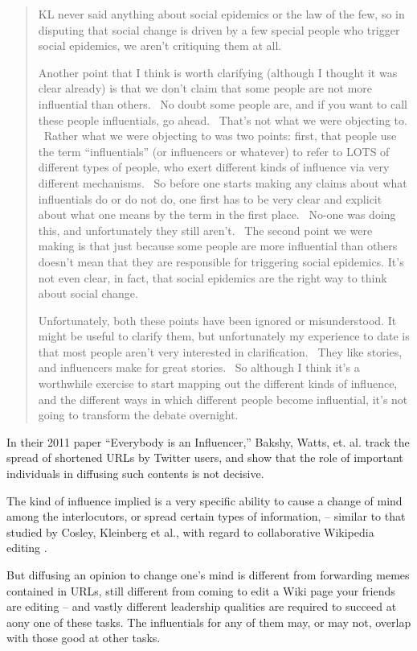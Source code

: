 \documentclass[10pt,oneside]{memoir}
\begin{document}
\begin{Spacing}{2}
\begin{quote}
KL never said anything about social epidemics or the law of the few, so in disputing that social change is driven by a few special people who trigger social epidemics, we aren't critiquing them at all. ~


Another point that I think is worth clarifying (although I thought it was clear already) is that we don't claim that some people are not more influential than others. ~No doubt some people are, and if you want to call these people influentials, go ahead. ~That's not what we were objecting to. ~Rather what we were objecting to was two points: first, that people use the term ``influentials'' (or influencers or whatever) to refer to LOTS of different types of people, who exert different kinds of influence via very different mechanisms. ~So before one starts making any claims about what influentials do or do not do, one first has to be very clear and explicit about what one means by the term in the first place. ~No-one was doing this, and unfortunately they still aren't. ~The second point we were making is that just because some people are more influential than others doesn't mean that they are responsible for triggering social epidemics. It's not even clear, in fact, that social epidemics are the right way to think about social change. ~


Unfortunately, both these points have been ignored or misunderstood. It might be useful to clarify them, but unfortunately my experience to date is that most people aren't very interested in clarification. ~They like stories, and influencers make for great stories. ~So although I think it's a worthwhile exercise to start mapping out the different kinds of influence, and the different ways in which different people become influential, it's not going to transform the debate overnight.
\end{quote}


In their 2011 paper ``Everybody is an Influencer,'' Bakshy, Watts, et. al. \cite{bakshy2011everyone} track the spread of shortened URLs by Twitter users, and show that the role of important individuals in diffusing such contents is not decisive.


The kind of influence implied is a very specific ability to cause a change of mind among the interlocutors, or spread certain types of information, -- similar to that studied by Cosley, Kleinberg et al., with regard to collaborative Wikipedia editing \cite{cosley2010sequential}.


But diffusing an opinion to change one's mind is different from forwarding memes contained in URLs, still different from coming to edit a Wiki page your friends are editing -- and vastly different leadership qualities are required to succeed at aony one of these tasks.  The influentials for any of them may, or may not, overlap with those good at other tasks.



\end{Spacing}
\end{document}
